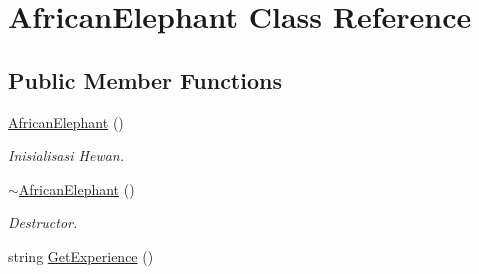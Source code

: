 \hypertarget{class_african_elephant}{}\section{African\+Elephant Class Reference}
\label{class_african_elephant}
\subsection*{Public Member Functions}
\begin{DoxyCompactItemize}
\item 
\hyperlink{class_african_elephant_afafb947626644b43e348d085d6a5eb31}{African\+Elephant} ()\hypertarget{class_african_elephant_afafb947626644b43e348d085d6a5eb31}{}\label{class_african_elephant_afafb947626644b43e348d085d6a5eb31}

\begin{DoxyCompactList}\small\item\em Inisialisasi Hewan. \end{DoxyCompactList}\item 
\hyperlink{class_african_elephant_a17ce0ba2364f220e4d1ca40a7ae5aa81}{$\sim$\+African\+Elephant} ()\hypertarget{class_african_elephant_a17ce0ba2364f220e4d1ca40a7ae5aa81}{}\label{class_african_elephant_a17ce0ba2364f220e4d1ca40a7ae5aa81}

\begin{DoxyCompactList}\small\item\em Destructor. \end{DoxyCompactList}\item 
string \hyperlink{class_african_elephant_aac5c88e6602badf90bb27facabe529e3}{Get\+Experience} ()\hypertarget{class_african_elephant_aac5c88e6602badf90bb27facabe529e3}{}\label{class_african_elephant_aac5c88e6602badf90bb27facabe529e3}


\end{DoxyCompactItemize}
